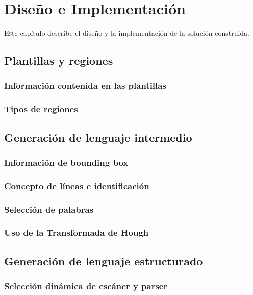 
\chapter{Diseño e Implementación}
\label{chap:implemetación}

\lettrine{E}ste capítulo describe el diseño y la implementación de la solución construida.

\section{Plantillas y regiones}
\subsection{Información contenida en las plantillas}
\subsection{Tipos de regiones}

\section{Generación de lenguaje intermedio}
\subsection{Información de bounding box}
\subsection{Concepto de líneas e identificación}
\subsection{Selección de palabras}
\subsection{Uso de la Transformada de Hough}

\section{Generación de lenguaje estructurado}
\subsection{Selección dinámica de escáner y parser}
